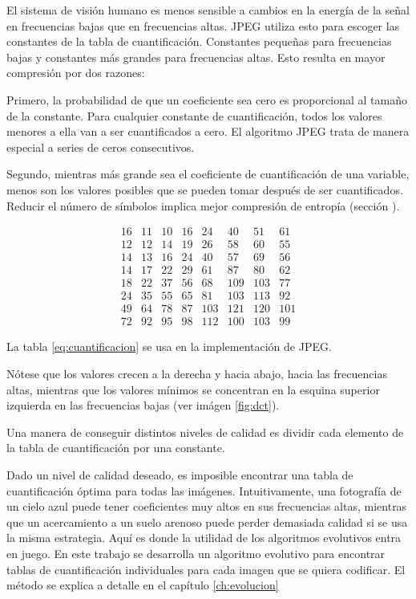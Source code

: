 El sistema de visión humano es menos sensible a cambios en la energía de la
señal en frecuencias bajas que en frecuencias altas. JPEG utiliza esto para
escoger las constantes de la tabla de cuantificación. Constantes pequeñas para
frecuencias bajas y constantes más grandes para frecuencias altas. Esto resulta
en mayor compresión por dos razones:

Primero, la probabilidad de que un coeficiente sea cero es proporcional al
tamaño de la constante. Para cualquier constante de cuantificación, todos los
valores menores a ella van a ser cuantificados a cero. El algoritmo JPEG trata
de manera especial a series de ceros consecutivos.

Segundo, mientras más grande sea el coeficiente de cuantificación de una
variable, menos son los valores posibles que se pueden tomar después de ser
cuantificados. Reducir el número de símbolos implica mejor compresión de
entropía (sección \label{sub:huffman}).

\begin{equation}
    \begin{matrix}
        16 & 11 & 10 & 16 & 24  & 40  & 51  & 61 \\
        12 & 12 & 14 & 19 & 26  & 58  & 60  & 55 \\
        14 & 13 & 16 & 24 & 40  & 57  & 69  & 56 \\
        14 & 17 & 22 & 29 & 61  & 87  & 80  & 62 \\
        18 & 22 & 37 & 56 & 68  & 109 & 103 & 77 \\
        24 & 35 & 55 & 65 & 81  & 103 & 113 & 92 \\
        49 & 64 & 78 & 87 & 103 & 121 & 120 & 101 \\
        72 & 92 & 95 & 98 & 112 & 100 & 103 & 99
    \end{matrix}
    \label{fig:reference-table}
\end{equation}
\label{eq:cuantificacion}

La tabla \ref{eq:cuantificacion} se usa en la implementación de JPEG.

Nótese que los valores crecen a la derecha y hacia abajo, hacia las frecuencias
altas, mientras que los valores mínimos se concentran en la esquina superior
izquierda en las frecuencias bajas (ver imágen \ref{fig:dct}).

Una manera de conseguir distintos niveles de calidad es dividir cada elemento
de la tabla de cuantificación por una constante.

Dado un nivel de calidad deseado, es imposible encontrar una tabla de
cuantificación óptima para todas las imágenes. Intuitivamente, una fotografía
de un cielo azul puede tener coeficientes muy altos en sus frecuencias altas,
mientras que un acercamiento a un suelo arenoso puede perder demasiada calidad
si se usa la misma estrategia. Aquí es donde la utilidad de los algoritmos
evolutivos entra en juego. En este trabajo se desarrolla un \gls{algoritmo
evolutivo} para encontrar tablas de cuantificación individuales para cada
imagen que se quiera codificar. El método se explica a detalle en el capítulo
\ref{ch:evolucion}

